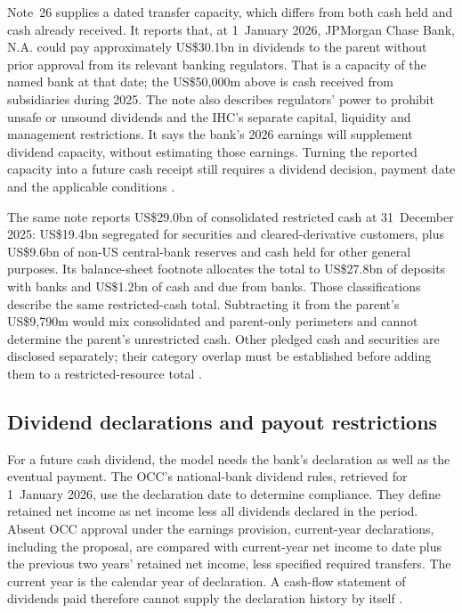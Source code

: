Note~26 supplies a dated transfer capacity, which differs from both cash held
and cash already received. It reports that, at 1~January 2026, JPMorgan Chase
Bank, N.A. could pay approximately US\$30.1bn in dividends to the parent
without prior approval from its relevant banking regulators. That is a
capacity of the named bank at that date; the US\$50{,}000m above is cash
received from subsidiaries during 2025. The note also describes regulators'
power to prohibit unsafe or unsound dividends and the IHC's separate capital,
liquidity and management restrictions. It says the bank's 2026 earnings will
supplement dividend capacity, without estimating those earnings. Turning the
reported capacity into a future cash receipt still requires a dividend decision,
payment date and the applicable conditions \citep[pp.~4, 292]{jpmorgan2025tenk}.

The same note reports US\$29.0bn of consolidated restricted cash at
31~December 2025: US\$19.4bn segregated for securities and cleared-derivative
customers, plus US\$9.6bn of non-US central-bank reserves and cash held for
other general purposes. Its balance-sheet footnote allocates the total to
US\$27.8bn of deposits with banks and US\$1.2bn of cash and due from banks.
Those classifications describe the same restricted-cash total. Subtracting it
from the parent's US\$9{,}790m would mix consolidated and parent-only
perimeters and cannot determine the parent's unrestricted cash. Other pledged
cash and securities are disclosed separately; their category overlap must be
established before adding them to a restricted-resource total
\citep[p.~292]{jpmorgan2025tenk}.


\subsection{Dividend declarations and payout restrictions}
\label{sec:bank-payout-restrictions}

For a future cash dividend, the model needs the bank's declaration as well as
the eventual payment. The OCC's national-bank dividend rules, retrieved for
1~January 2026, use the declaration date to determine compliance. They define
retained net income as net income less all dividends declared in the period.
Absent OCC approval under the earnings provision, current-year declarations, including
the proposal, are compared with current-year net income to date plus the
previous two years' retained net income, less specified required transfers.
The current year is the calendar year of declaration. A cash-flow statement
of dividends paid therefore cannot supply the declaration history by itself
\citep[12~CFR~5.61--5.64]{occnationaldividends2026}.

